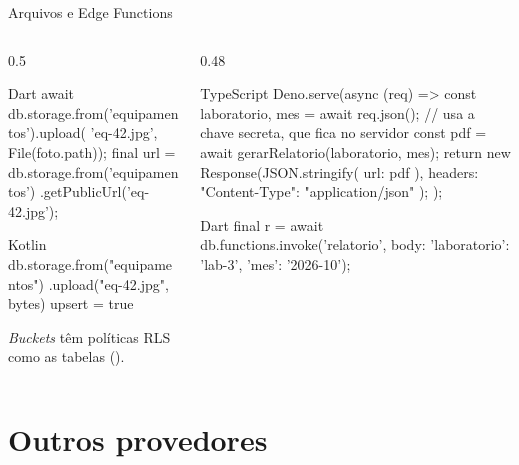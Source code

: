 \documentclass[aspectratio=169,10pt]{beamer}
\begin{document}
\begin{frame}[fragile]{Arquivos e Edge Functions}
  \begin{columns}[T]
    \begin{column}{0.5\textwidth}
\begin{codigo}[title=Foto do equipamento (Dart)]{Dart}
await db.storage.from('equipamentos').upload(
    'eq-42.jpg', File(foto.path));
final url = db.storage.from('equipamentos')
    .getPublicUrl('eq-42.jpg');
\end{codigo}
\begin{codigo}[title=Kotlin]{Kotlin}
db.storage.from("equipamentos")
  .upload("eq-42.jpg", bytes) { upsert = true }
\end{codigo}
      \begin{dica}
        \emph{Buckets} têm políticas RLS como as tabelas ().
      \end{dica}
    \end{column}
    \begin{column}{0.48\textwidth}
\begin{codigo}[title=supabase/functions/relatorio/index.ts]{TypeScript}
Deno.serve(async (req) => {
  const { laboratorio, mes } = await req.json();
  // usa a chave secreta, que fica no servidor
  const pdf = await gerarRelatorio(laboratorio, mes);
  return new Response(JSON.stringify({ url: pdf }),
    { headers: { "Content-Type": "application/json" } });
});
\end{codigo}
\begin{codigo}[title=Chamando do app (Dart)]{Dart}
final r = await db.functions.invoke('relatorio',
    body: {'laboratorio': 'lab-3', 'mes': '2026-10'});
\end{codigo}
    \end{column}
  \end{columns}
\end{frame}

\section{Outros provedores}
\end{document}
